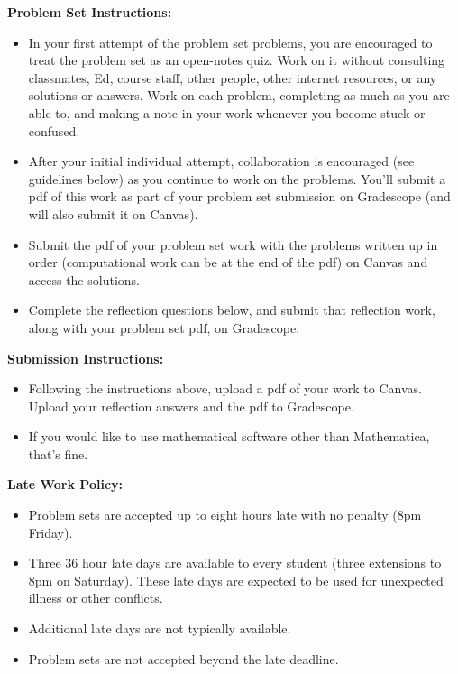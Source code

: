 \documentclass[12pt,letterpaper]{exam}
\begin{document}
 \pdfpageheight 11in 
  \pdfpagewidth 8.5in

\noindent\textbf{Problem Set Instructions:}  
\begin{itemize}
\itemsep0pt
\item In your first attempt of the problem set problems, you are encouraged to treat the problem set as an open-notes quiz.  Work on it without consulting classmates, Ed, course staff, other people, other internet resources, or any solutions or answers.  Work on each problem, completing as much as you are able to, and making a note in your work whenever you become stuck or confused.
\item After your initial individual attempt, collaboration is encouraged (see guidelines below) as you continue to work on the problems.  You'll submit a pdf of this work as part of your problem set submission on Gradescope (and will also submit it on Canvas).
\item Submit the pdf of your problem set work with the problems written up in order (computational work can be at the end of the pdf) on Canvas and access the solutions.
\item Complete the reflection questions below, and submit that reflection work, along with your problem set pdf, on Gradescope.
\end{itemize}
  
\noindent\textbf{Submission Instructions:}  
\begin{itemize}
\item Following the instructions above, upload a pdf of your work to Canvas.  Upload your reflection answers and the pdf to Gradescope.
\item If you would like to use mathematical software other than Mathematica, that's fine. 
\end{itemize}

\noindent\textbf{Late Work Policy:}
\begin{itemize}
\itemsep0pt
\item Problem sets are accepted up to eight hours late with no penalty (8pm Friday). 
\item Three 36 hour late days are available to every student (three extensions to 8pm on Saturday).  These late days are expected to be used for unexpected illness or other conflicts.
\item Additional late days are not typically 
available.
\item Problem sets are not accepted beyond the late deadline.
\end{itemize}
\end{document}
